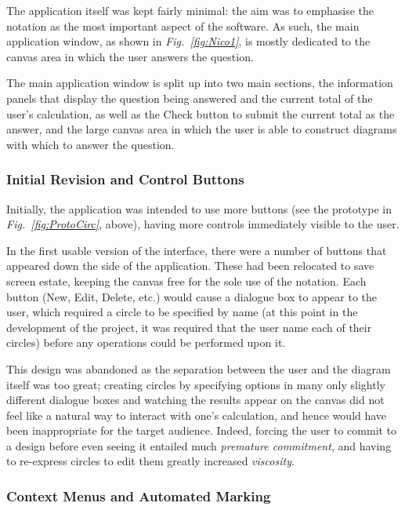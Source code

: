 \documentclass[12pt,twoside,notitlepage,xetex]{report}
\begin{document}
{The application itself was kept fairly minimal: the aim was to emphasise the notation as the most important aspect of the software.  As such, the main application window, as shown in \emph{Fig.~\ref{fig:Nico1}}, is mostly dedicated to the canvas area in which the user answers the question.

The main application window is split up into two main sections, the information panels that display the question being answered and the current total of the user's calculation, as well as the {\sfapp Check} button to submit the current total as the answer, and the large canvas area in which the user is able to construct diagrams with which to answer the question.

\subsubsection{Initial Revision and Control Buttons}

Initially, the application was intended to use more buttons (see the prototype in \emph{Fig.~\ref{fig:ProtoCirc}}, above), having more controls immediately visible to the user.

In the first usable version of the interface, there were a number of buttons that appeared down the side of the application.  These had been relocated to save screen estate, keeping the canvas free for the sole use of the notation.  Each button ({\sfapp New}, {\sfapp Edit}, {\sfapp Delete}, etc.) would cause a dialogue box to appear to the user, which required a circle to be specified by name (at this point in the development of the project, it was required that the user name each of their circles) before any operations could be performed upon it.

This design was abandoned as the separation between the user and the diagram itself was too great; creating circles by specifying options in many only slightly different dialogue boxes and watching the results appear on the canvas did not feel like a natural way to interact with one's calculation, and hence would have been inappropriate for the target audience.  Indeed, forcing the user to commit to a design before even seeing it entailed much \emph{premature commitment}, and having to re-express circles to edit them greatly increased \emph{viscosity}.

\subsubsection{Context Menus and Automated Marking}

}
\end{document}
